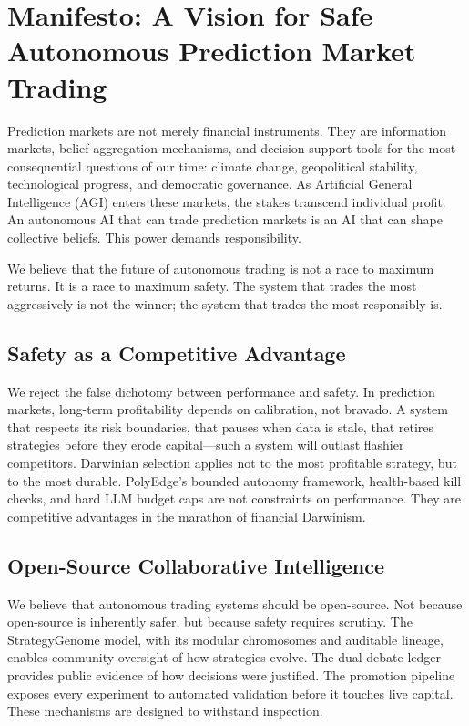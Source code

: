 \section{Manifesto: A Vision for Safe Autonomous Prediction Market Trading}\label{sec:manifesto}

Prediction markets are not merely financial instruments. They are information markets, belief-aggregation mechanisms, and decision-support tools for the most consequential questions of our time: climate change, geopolitical stability, technological progress, and democratic governance. As Artificial General Intelligence (AGI) enters these markets, the stakes transcend individual profit. An autonomous AI that can trade prediction markets is an AI that can shape collective beliefs. This power demands responsibility.

We believe that the future of autonomous trading is not a race to maximum returns. It is a race to maximum safety. The system that trades the most aggressively is not the winner; the system that trades the most responsibly is.

\subsection{Safety as a Competitive Advantage}

We reject the false dichotomy between performance and safety. In prediction markets, long-term profitability depends on calibration, not bravado. A system that respects its risk boundaries, that pauses when data is stale, that retires strategies before they erode capital---such a system will outlast flashier competitors. Darwinian selection applies not to the most profitable strategy, but to the most durable. PolyEdge's bounded autonomy framework, health-based kill checks, and hard LLM budget caps are not constraints on performance. They are competitive advantages in the marathon of financial Darwinism.

\subsection{Open-Source Collaborative Intelligence}

We believe that autonomous trading systems should be open-source. Not because open-source is inherently safer, but because safety requires scrutiny. The StrategyGenome model, with its modular chromosomes and auditable lineage, enables community oversight of how strategies evolve. The dual-debate ledger provides public evidence of how decisions were justified. The promotion pipeline exposes every experiment to automated validation before it touches live capital. These mechanisms are designed to withstand inspection.

